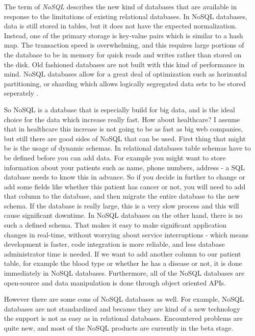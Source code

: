 \documentclass{article}
\begin{document}
The term of \emph{NoSQL} describes the new kind of databases that are available in response to the limitations of existing relational databases. In NoSQL databases, data is still stored in tables, but it does not have the expected normalization. Instead, one of the primary storage is key-value pairs which is similar to a hash map.  The transaction speed is overwhelming, and this requires large portions of the database to be in memory for quick reads and writes rather than stored on the disk. Old fashioned databases are not built with this kind of performance in mind. NoSQL databases allow for a great deal of optimization such as horizontal partitioning, or sharding which allows logically segregated data sets to be stored seperately \cite{clouddb9}. 


So NoSQL is a database that is especially build for big data, and is the ideal choice for the data which increase really fast. How about healthcare? I assume that in healthcare this increase is not going to be as fast as big web companies, but still there are good sides of NoSQL that can be used. First thing that might be is the usage of dynamic schemas. In relational databases table schemas have to be defined before you can add data. For example you might want to store information about your patients such as name, phone numbers, address - a SQL database needs to know this in advance. So if you decide in further to change or add some fields like whether this patient has cancer or not, you will need to add that column to the database, and then migrate the entire database to the new schema. If the database is really large, this is a very slow process and this will cause significant downtime. In NoSQL databases on the other hand, there is no such a defined schema. That makes it easy to make significant application changes in real-time, without worrying about service interruptions - which means development is faster, code integration is more reliable, and less database administrator time is needed. If we want to add another column to our patient table, for example the blood type or whether he has a disease or not, it is done immediately in NoSQL databases. Furthermore, all of the NoSQL databases are open-source and data manipulation is done through object oriented APIs. 

However there are some cons of NoSQL databases as well. For example, NoSQL databases are not standardized and because they are kind of a new technology the support is not as easy as in relational databases. Encountered problems are quite new, and most of the NoSQL products are currently in the beta stage. 
\end{document}

